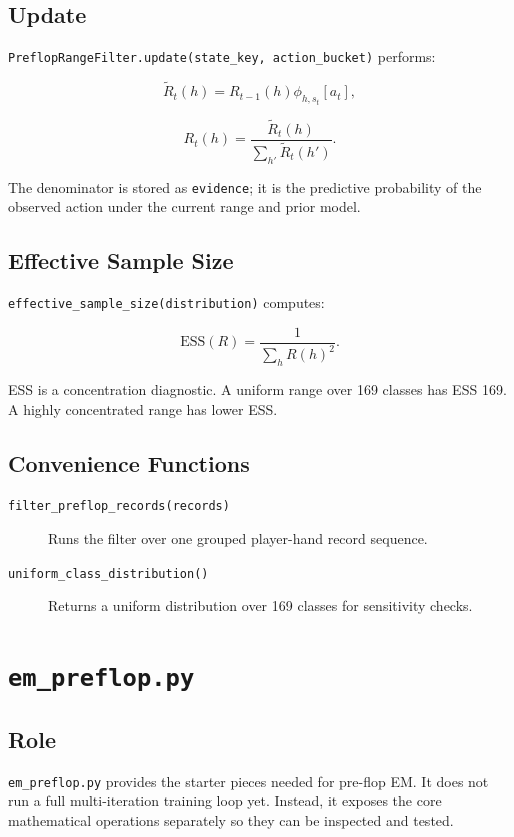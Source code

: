 \documentclass[11pt]{article}
\begin{document}
\subsection{Update}

\texttt{PreflopRangeFilter.update(state\_key, action\_bucket)} performs:

\[
\widetilde{R}_t(h)
=
R_{t-1}(h)
\phi_{h,s_t}[a_t],
\]

\[
R_t(h)
=
\frac{\widetilde{R}_t(h)}
{\sum_{h'} \widetilde{R}_t(h')}.
\]

The denominator is stored as \texttt{evidence}; it is the predictive
probability of the observed action under the current range and prior model.

\subsection{Effective Sample Size}

\texttt{effective\_sample\_size(distribution)} computes:

\[
\mathrm{ESS}(R)
=
\frac{1}{\sum_h R(h)^2}.
\]

ESS is a concentration diagnostic. A uniform range over 169 classes has ESS
169. A highly concentrated range has lower ESS.

\subsection{Convenience Functions}

\begin{description}
  \item[\texttt{filter\_preflop\_records(records)}] Runs the filter over one
  grouped player-hand record sequence.
  \item[\texttt{uniform\_class\_distribution()}] Returns a uniform distribution
  over 169 classes for sensitivity checks.
\end{description}

\section{\texttt{em\_preflop.py}}

\subsection{Role}

\texttt{em\_preflop.py} provides the starter pieces needed for pre-flop EM. It
does not run a full multi-iteration training loop yet. Instead, it exposes the
core mathematical operations separately so they can be inspected and tested.
\end{document}
